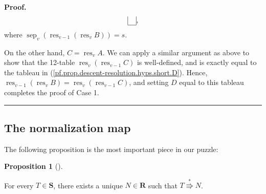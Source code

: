 \documentclass[numbers=enddot,12pt,final,onecolumn,notitlepage]{scrartcl}%
\theoremstyle{definition}
\newtheorem{prop}[theo]{Proposition}
\newenvironment{proposition}[1][]
{\begin{prop}[#1]\begin{leftbar}}
{\end{leftbar}\end{prop}}
\newenvironment{proof}[1][Proof]{\noindent\textbf{#1.} }{\ \rule{0.5em}{0.5em}}
\begin{document}
\begin{proof}
\begin{equation}
\begin{tabular}{ccc}
\cline{2-2} \multicolumn{1}{|c|}{} \\
\cline{1-1}
\end{tabular}%
, \label{pf.prop.descent-resolution.hyps.short.D}%
\end{equation}
where $\operatorname*{sep}\nolimits_{v} \left( \operatorname*{res}\nolimits_{v-1}\left(  \operatorname*{res}\nolimits_{v}%
B\right) \right) = s$.

On the other hand, $C = \operatorname*{res}\nolimits_{v}A$. We can apply a similar argument as above to show that the 12-table $\operatorname*{res}\nolimits_{v}\left(
\operatorname*{res}\nolimits_{v-1}C\right)  $ is well-defined, and is exactly equal to the tableau in (\ref{pf.prop.descent-resolution.hyps.short.D}).
Hence, $\operatorname*{res}%
\nolimits_{v-1}\left(  \operatorname*{res}\nolimits_{v}B\right) = \operatorname*{res}\nolimits_{v}\left(
\operatorname*{res}\nolimits_{v-1}C\right)$, and setting $D$ equal to this tableau completes the proof of Case 1.
\end{proof}

\subsection{The normalization map}

The following proposition is the most important piece in our puzzle:

\begin{proposition}
\label{prop.BK.norm}For every $T\in\mathbf{S}$, there exists a unique
$N\in\mathbf{R}$ such that $T\overset{\ast}{\Rrightarrow}N$.
\end{proposition}
\end{document}
